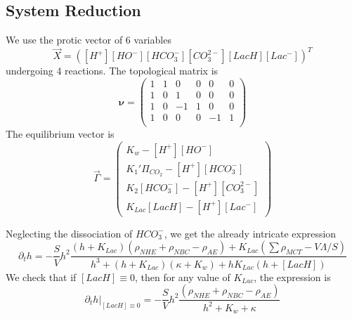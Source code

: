 \documentclass{revtex4}
\begin{document}
\subsection{System Reduction}
We use the protic vector of 6 variables
\begin{equation}
	\vec{X} = \left( \left[H^+\right]  \left[HO^-\right] \left[HCO_3^-\right] \left[CO_3^{2-}\right] \left[LacH\right]  \left[Lac^-\right] \right)^T
\end{equation}
undergoing 4 reactions.
The topological matrix is
\begin{equation}
	\boldsymbol{\nu} =
	\begin{pmatrix}
	1 & 1 & 0 & 0 & 0 & 0\\
	1 & 0 & 1 & 0 & 0 & 0\\
	1 & 0 & -1 & 1 & 0 & 0\\
	1 & 0 & 0 & 0  & -1 & 1\\
	\end{pmatrix}
\end{equation}
The equilibrium vector is
\begin{equation}
	\vec{\Gamma} =
	 \begin{pmatrix}
	K_w - \left[H^+\right]  \left[HO^-\right]\\
	K_1'\Pi_{CO_2} - \left[H^+\right]\left[HCO_3^-\right]\\
	K_2 {\left[HCO_3^-\right]} -\left[H^+\right]\left[CO_3^{2-}\right]\\
	K_{Lac}\left[LacH\right] - \left[H^+\right]\left[Lac^-\right]
	\end{pmatrix}
\end{equation}

Neglecting the dissociation of $HCO_3^-$, we get the already intricate expression
\begin{equation}
\partial_t h = - \dfrac{S}{V} h^2
\dfrac{\left(h+K_{Lac}\right)\left(\rho_{NHE}+\rho_{NBC}-\rho_{AE}\right)+K_{Lac}\left(\sum \rho_{MCT}-V\Lambda/S\right)}
{h^3+(h+K_{Lac})\left(\kappa+K_w\right)+h K_{Lac}\left(h+\left[LacH\right]\right)}
\end{equation}
We check that if $\left[LacH\right]\equiv0$, then for any value of $K_{Lac}$, the expression is
$$
	\partial_t h\vert_{\left[LacH\right]\equiv0} = 
	-\dfrac{S}{V} h^2
	\dfrac{\left(\rho_{NHE}+\rho_{NBC}-\rho_{AE}\right)}{h^2+K_w+\kappa}
$$
\end{document}
